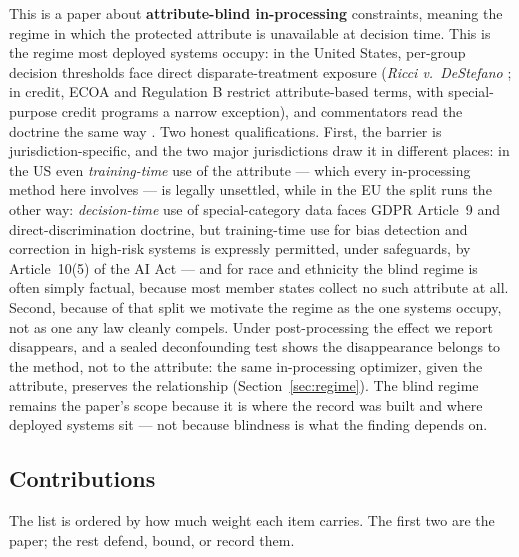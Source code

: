 \documentclass[conference]{IEEEtran}
\begin{document}
This is a paper about \textbf{attribute-blind in-processing} constraints, meaning the regime
in which the protected attribute is unavailable at decision time. This is the regime most
deployed systems occupy: in the United States, per-group decision thresholds face direct
disparate-treatment exposure (\emph{Ricci v.\ DeStefano} \cite{ricci2009}; in credit, ECOA
and Regulation B restrict attribute-based terms, with special-purpose credit programs a narrow exception), and commentators read the
doctrine the same way \cite{barocas2016,corbett2017}. Two honest qualifications. First,
the barrier is jurisdiction-specific, and the two major jurisdictions draw it in different
places: in the US even \emph{training-time} use of the attribute --- which every
in-processing method here involves --- is legally unsettled, while in the EU the split
runs the other way: \emph{decision-time} use of special-category data faces GDPR
Article~9 and direct-discrimination doctrine, but training-time use for bias detection
and correction in high-risk systems is expressly permitted, under safeguards, by
Article~10(5) of the AI Act --- and for race and ethnicity the blind regime is often
simply factual, because most member states collect no such attribute at all. Second,
because of that split we motivate the regime as the one systems occupy, not as one any
law cleanly compels. Under
post-processing the effect we report disappears, and a sealed deconfounding test shows
the disappearance belongs to the method, not to the attribute: the same in-processing
optimizer, given the attribute, preserves the relationship
(Section~\ref{sec:regime}). The blind regime remains the paper's scope because it is
where the record was built and where deployed systems sit --- not because blindness is
what the finding depends on.

\subsection{Contributions}

The list is ordered by how much weight each item carries. The first two are the paper; the
rest defend, bound, or record them.
\end{document}
